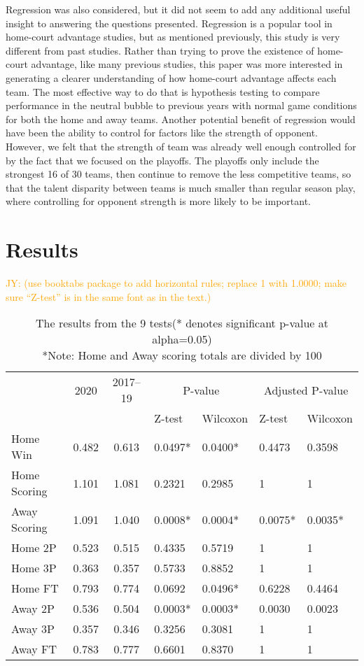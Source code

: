 \documentclass[10pt]{article}
\newcommand{\jy}[1]{\textcolor{orange}{JY: (#1)}}
\begin{document}
Regression was also considered, but it did not seem to add any additional 
useful insight to answering the questions presented. Regression is a popular
tool in home-court advantage studies, but as mentioned previously, this
study is very different from past studies. Rather than trying to prove the
existence of home-court advantage, like many previous studies, this paper
was more interested in generating a clearer understanding of how home-court
advantage affects each team. The most effective way to do that is hypothesis
testing to compare performance in the neutral bubble to previous years with
normal game conditions for both the home and away teams. Another potential
benefit of regression would have been the ability to control for factors
like the strength of opponent. However, we felt that the strength of team was
already well enough controlled for by the fact that we focused on the
playoffs. The playoffs only include the strongest 16 of 30 teams, then
continue to remove the less competitive teams, so that the talent disparity
between teams is much smaller than regular season play, where controlling for
opponent strength is more likely to be important.

\section{Results}

\jy{use booktabs package to add horizontal rules; replace 1 with
  1.0000; make sure ``Z-test'' is in the same font as in the text.}

\begin{table}[tbp]
  \caption{The results from the 9 tests(* denotes significant p-value at alpha=0.05)
  \\*Note: Home and Away scoring totals are divided by 100}
  \label{tab:table}
\centering
\begin{tabular}[t]{lccllll}
  \toprule
  & 2020 & 2017--19 & \multicolumn{2}{c}{P-value} & \multicolumn{2}{c}{Adjusted P-value}\\
\cmidrule(lr){4-5}\cmidrule(lr){6-7}
  &          &                & Z-test & Wilcoxon & Z-test & Wilcoxon\\
  \midrule
  Home Win & 0.482 & 0.613 & 0.0497* & 0.0400* & 0.4473 & 0.3598\\
Home Scoring & 1.101 & 1.081 & 0.2321 & 0.2985 & 1 & 1\\
Away Scoring & 1.091 & 1.040 & 0.0008* & 0.0004* & 0.0075* & 0.0035*\\
Home 2P & 0.523 & 0.515 & 0.4335 & 0.5719 & 1 & 1\\
Home 3P & 0.363 & 0.357 & 0.5733 & 0.8852 & 1 & 1\\
Home FT & 0.793 & 0.774 & 0.0692 & 0.0496* & 0.6228 & 0.4464\\
Away 2P & 0.536 & 0.504 & 0.0003* & 0.0003* & 0.0030 & 0.0023\\
Away 3P & 0.357 & 0.346 & 0.3256 & 0.3081 & 1 & 1\\
Away FT & 0.783 & 0.777 & 0.6601 & 0.8370 & 1 & 1\\
  \bottomrule
\end{tabular}
\end{table}
\end{document}
